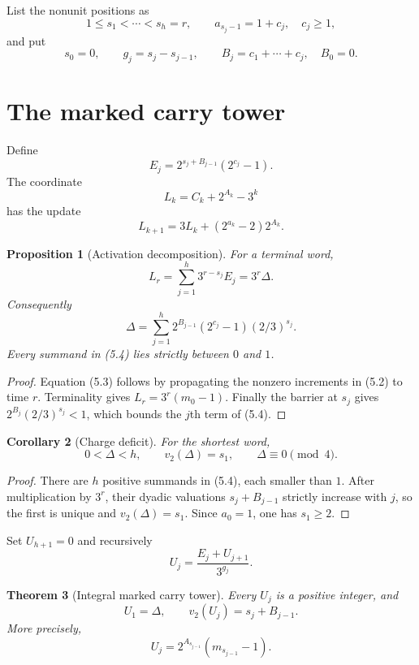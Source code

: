\documentclass[11pt,reqno]{amsart}
\newtheorem{theorem}{Theorem}[section]
\newtheorem{proposition}[theorem]{Proposition}
\newtheorem{corollary}[theorem]{Corollary}
\theoremstyle{remark}
\newcommand{\vtwo}{v_2}
\begin{document}
List the nonunit positions as
\[
 1\le s_1<\cdots<s_h=r,\qquad a_{s_j-1}=1+c_j,\quad c_j\ge1,
\]
and put
\[
 s_0=0,\qquad g_j=s_j-s_{j-1},\qquad
 B_j=c_1+\cdots+c_j,\quad B_0=0.
\]

\section{The marked carry tower}

Define
\[
 E_j=2^{s_j+B_{j-1}}(2^{c_j}-1).                      \tag{5.1}
\]
The coordinate
\[
 L_k=C_k+2^{A_k}-3^k
\]
has the update
\[
 L_{k+1}=3L_k+(2^{a_k}-2)2^{A_k}.                    \tag{5.2}
\]

\begin{proposition}[Activation decomposition]\label{prop:activation}
For a terminal word,
\[
 L_r=\sum_{j=1}^h3^{r-s_j}E_j=3^r\Delta.             \tag{5.3}
\]
Consequently
\[
 \Delta=\sum_{j=1}^h
 2^{B_{j-1}}(2^{c_j}-1)(2/3)^{s_j}.                  \tag{5.4}
\]
Every summand in (5.4) lies strictly between $0$ and $1$.
\end{proposition}

\begin{proof}
Equation (5.3) follows by propagating the nonzero increments in (5.2) to
time $r$.  Terminality gives $L_r=3^r(m_0-1)$.  Finally the barrier at
$s_j$ gives $2^{B_j}(2/3)^{s_j}<1$, which bounds the $j$th term of (5.4).
\end{proof}

\begin{corollary}[Charge deficit]\label{cor:deficit}
For the shortest word,
\[
 0<\Delta<h,\qquad \vtwo(\Delta)=s_1,\qquad
 \Delta\equiv0\pmod4.
\]
\end{corollary}

\begin{proof}
There are $h$ positive summands in (5.4), each smaller than $1$.  After
multiplication by $3^r$, their dyadic valuations
$s_j+B_{j-1}$ strictly increase with $j$, so the first is unique and
$\vtwo(\Delta)=s_1$.  Since $a_0=1$, one has $s_1\ge2$.
\end{proof}

Set $U_{h+1}=0$ and recursively
\[
 U_j=\frac{E_j+U_{j+1}}{3^{g_j}}.                    \tag{5.5}
\]

\begin{theorem}[Integral marked carry tower]\label{thm:tower}
Every $U_j$ is a positive integer, and
\[
 U_1=\Delta,\qquad
 \vtwo(U_j)=s_j+B_{j-1}.                              \tag{5.6}
\]
More precisely,
\[
 U_j=2^{A_{s_{j-1}}}(m_{s_{j-1}}-1).                 \tag{5.7}
\]
\end{theorem}
\end{document}
